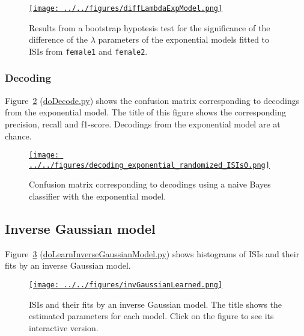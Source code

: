 \documentclass[10pt]{article}
\begin{document}
\begin{figure}
    \href{http://www.gatsby.ucl.ac.uk/~rapela/singleNeuronSpikesAnalysisTutorial/figures/diffLambdaExpModel.html}{\texttt{[image: ../../figures/diffLambdaExpModel.png]}}
    \caption{Results from a bootstrap hypotesis test for the significance of the difference of the $\lambda$ parameters of the exponential models fitted to ISIs from \texttt{female1} and \texttt{female2}.}
    \label{fig:diffLambdaExpModel_fit}
\end{figure}

\subsubsection{Decoding}

Figure~\ref{fig:expModelConusionMatrix} (\href{https://github.com/joacorapela/singleNeuronSpikesAnalysisTutorial/blob/master/code/scripts/doDecode.py}{doDecode.py}) shows the confusion matrix
corresponding to decodings from the exponential model. The title of
this figure shows the corresponding precision, recall and f1-score.
Decodings from the exponential model are at chance.

\begin{figure}
    \href{http://www.gatsby.ucl.ac.uk/~rapela/singleNeuronSpikesAnalysisTutorial/figures/decoding_exponential_randomized_ISIs0.html}{\texttt{[image: ../../figures/decoding\_exponential\_randomized\_ISIs0.png]}}
    \caption{Confusion matrix corresponding to decodings using a naive Bayes classifier with the exponential model.}
    \label{fig:expModelConusionMatrix}
\end{figure}

\subsection{Inverse Gaussian model}
\label{sec:inverse_Gaussian_model}

Figure~\ref{fig:invGaussian_model_fit} (\href{https://github.com/joacorapela/singleNeuronSpikesAnalysisTutorial/blob/master/code/scripts/doLearnInverseGaussianModel.py}{doLearnInverseGaussianModel.py}) shows histograms of ISIs and
their fits by an inverse Gaussian model.

\begin{figure}
    \href{http://www.gatsby.ucl.ac.uk/~rapela/singleNeuronSpikesAnalysisTutorial/figures/invGaussianLearned.html}{\texttt{[image: ../../figures/invGaussianLearned.png]}}

    \caption{ISIs and their fits by an inverse Gaussian model. The
    title shows the estimated parameters for each model. Click on the
    figure to see its interactive version.}

    \label{fig:invGaussian_model_fit}
\end{figure}
\end{document}
